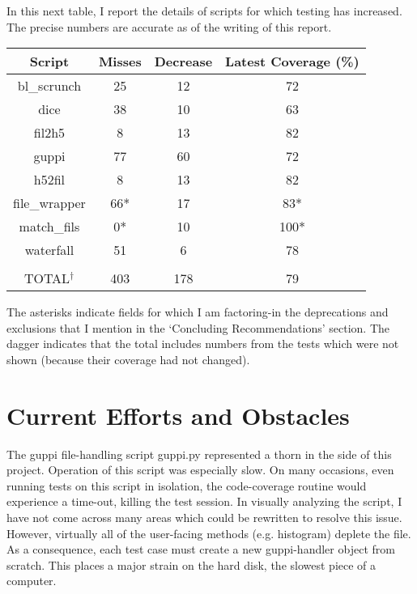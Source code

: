 \documentclass[12pt]{article}
\begin{document}
In this next table, I report the details of scripts for which testing has increased. The precise numbers are accurate as of the writing of this report.

\begin{center}
 \begin{tabular}{||c c c c||} 
 \hline
 Script & Misses & Decrease & Latest Coverage (\%)\\ [0.5ex] 
\hline
bl\_scrunch & 25 & 12 & 72 \\
\hline
dice & 38 & 10 & 63 \\
\hline
fil2h5 & 8 & 13 & 82 \\
\hline
guppi & 77 & 60 & 72 \\
\hline
h52fil & 8 & 13 & 82 \\
\hline
file\_wrapper & 66* & 17 & 83* \\
\hline
match\_fils & 0* & 10 & 100* \\
\hline
waterfall & 51 & 6 & 78 \\
\hline
&&&
\\
\hline
TOTAL$^\dagger$ & 403 & 178 & 79 \\ [1ex] 
\hline
\end{tabular}
\end{center}

The asterisks indicate fields for which I am factoring-in the deprecations and exclusions that I mention in the `Concluding Recommendations' section. The dagger indicates that the total includes numbers from the tests which were not shown (because their coverage had not changed).


\section{Current Efforts and Obstacles}

\quad \quad The guppi file-handling script guppi.py represented a thorn in the side of this project. Operation of this script was especially slow. On many occasions, even running tests on this script in isolation, the code-coverage routine would experience a time-out, killing the test session. In visually analyzing the script, I have not come across many areas which could be rewritten to resolve this issue. However, virtually all of the user-facing methods (e.g. histogram) deplete the file. As a consequence, each test case must create a new guppi-handler object from scratch. This places a major strain on the hard disk, the slowest piece of a computer.
\end{document}
